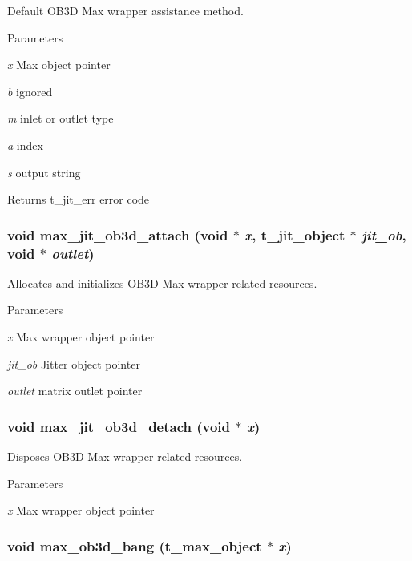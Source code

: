 Default OB3D Max wrapper assistance method. 
\begin{DoxyParams}{Parameters}
\item[{\em x}]Max object pointer \item[{\em b}]ignored \item[{\em m}]inlet or outlet type \item[{\em a}]index \item[{\em s}]output string\end{DoxyParams}
\begin{DoxyReturn}{Returns}
t\_\-jit\_\-err error code 
\end{DoxyReturn}
\hypertarget{group__ob3dmod_ga00933af2acf7bd26e6480c6e234faecd}{
\subsubsection[{max\_\-jit\_\-ob3d\_\-attach}]{\setlength{\rightskip}{0pt plus 5cm}void max\_\-jit\_\-ob3d\_\-attach (void $\ast$ {\em x}, \/  {\bf t\_\-jit\_\-object} $\ast$ {\em jit\_\-ob}, \/  void $\ast$ {\em outlet})}}
\label{group__ob3dmod_ga00933af2acf7bd26e6480c6e234faecd}


Allocates and initializes OB3D Max wrapper related resources. 
\begin{DoxyParams}{Parameters}
\item[{\em x}]Max wrapper object pointer \item[{\em jit\_\-ob}]Jitter object pointer \item[{\em outlet}]matrix outlet pointer \end{DoxyParams}
\hypertarget{group__ob3dmod_ga2a6c8c09bfdbaff867e61ac74fa08a7d}{
\subsubsection[{max\_\-jit\_\-ob3d\_\-detach}]{\setlength{\rightskip}{0pt plus 5cm}void max\_\-jit\_\-ob3d\_\-detach (void $\ast$ {\em x})}}
\label{group__ob3dmod_ga2a6c8c09bfdbaff867e61ac74fa08a7d}


Disposes OB3D Max wrapper related resources. 
\begin{DoxyParams}{Parameters}
\item[{\em x}]Max wrapper object pointer \end{DoxyParams}
\hypertarget{group__ob3dmod_ga28495cb4eb40093b45f576c6ddf41ff6}{
\subsubsection[{max\_\-ob3d\_\-bang}]{\setlength{\rightskip}{0pt plus 5cm}void max\_\-ob3d\_\-bang ({\bf t\_\-max\_\-object} $\ast$ {\em x})}}
\label{group__ob3dmod_ga28495cb4eb40093b45f576c6ddf41ff6}


